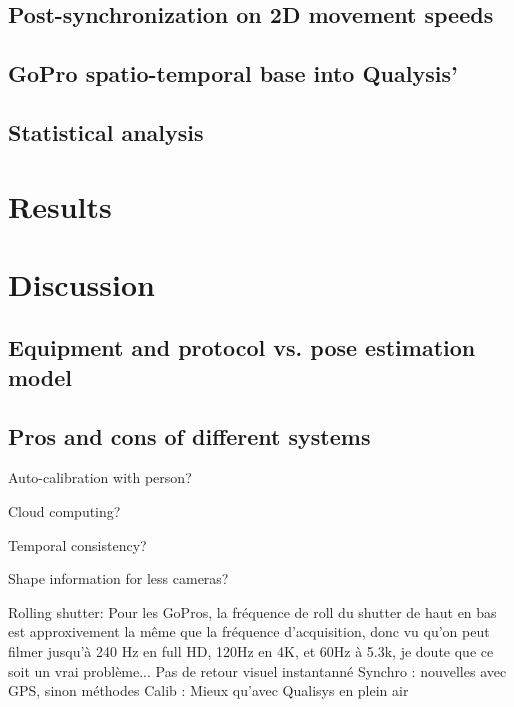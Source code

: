 \subsection{Post-synchronization on 2D movement speeds}
\blindtext

\subsection{GoPro spatio-temporal base into Qualysis'}
\blindtext

\subsection{Statistical analysis}
\blindtext


\section{Results}
\blindtext


\section{Discussion}
\subsection{Equipment and protocol vs. pose estimation model}
\blindtext

\subsection{Pros and cons of different systems}

Auto-calibration with person?

Cloud computing?

Temporal consistency?

Shape information for less cameras?

Rolling shutter: Pour les GoPros, la fréquence de roll du shutter de haut en bas est approxivement la même que la fréquence d'acquisition, donc vu qu'on peut filmer jusqu'à 240 Hz en full HD, 120Hz en 4K, et 60Hz à 5.3k, je doute que ce soit un vrai problème...
Pas de retour visuel instantanné
Synchro : nouvelles avec GPS, sinon méthodes
Calib : Mieux qu'avec Qualisys en plein air

\blindtext
